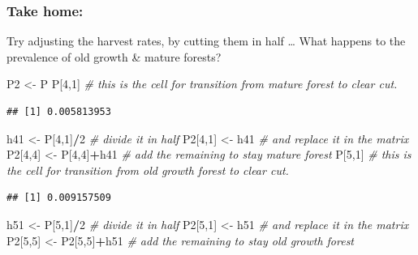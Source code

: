 \documentclass[
]{article}
\newenvironment{Shaded}{\begin{snugshade}}{\end{snugshade}}
\newcommand{\CommentTok}[1]{\textcolor[rgb]{0.56,0.35,0.01}{\textit{#1}}}
\newcommand{\DecValTok}[1]{\textcolor[rgb]{0.00,0.00,0.81}{#1}}
\newcommand{\NormalTok}[1]{#1}
\newcommand{\OtherTok}[1]{\textcolor[rgb]{0.56,0.35,0.01}{#1}}
\newcommand{\SpecialCharTok}[1]{\textcolor[rgb]{0.81,0.36,0.00}{\textbf{#1}}}
\begin{document}
\subsubsection{Take home:}\label{take-home}

Try adjusting the harvest rates, by cutting them in half \ldots{} What
happens to the prevalence of old growth \& mature forests?

\begin{Shaded}
\begin{Highlighting}[]
\NormalTok{P2 }\OtherTok{\textless{}{-}}\NormalTok{ P}
\NormalTok{P[}\DecValTok{4}\NormalTok{,}\DecValTok{1}\NormalTok{]   }\CommentTok{\# this is the cell for transition from mature forest to clear cut.}
\end{Highlighting}
\end{Shaded}

\begin{verbatim}
## [1] 0.005813953
\end{verbatim}

\begin{Shaded}
\begin{Highlighting}[]
\NormalTok{h41 }\OtherTok{\textless{}{-}}\NormalTok{ P[}\DecValTok{4}\NormalTok{,}\DecValTok{1}\NormalTok{]}\SpecialCharTok{/}\DecValTok{2}  \CommentTok{\# divide it in half}
\NormalTok{P2[}\DecValTok{4}\NormalTok{,}\DecValTok{1}\NormalTok{] }\OtherTok{\textless{}{-}}\NormalTok{ h41   }\CommentTok{\# and replace it in the matrix}
\NormalTok{P2[}\DecValTok{4}\NormalTok{,}\DecValTok{4}\NormalTok{] }\OtherTok{\textless{}{-}}\NormalTok{ P[}\DecValTok{4}\NormalTok{,}\DecValTok{4}\NormalTok{]}\SpecialCharTok{+}\NormalTok{h41  }\CommentTok{\# add the remaining to stay mature forest}
\NormalTok{P[}\DecValTok{5}\NormalTok{,}\DecValTok{1}\NormalTok{]    }\CommentTok{\# this is the cell for transition from old growth forest to clear cut.}
\end{Highlighting}
\end{Shaded}

\begin{verbatim}
## [1] 0.009157509
\end{verbatim}

\begin{Shaded}
\begin{Highlighting}[]
\NormalTok{h51 }\OtherTok{\textless{}{-}}\NormalTok{ P[}\DecValTok{5}\NormalTok{,}\DecValTok{1}\NormalTok{]}\SpecialCharTok{/}\DecValTok{2}   \CommentTok{\# divide it in half}
\NormalTok{P2[}\DecValTok{5}\NormalTok{,}\DecValTok{1}\NormalTok{] }\OtherTok{\textless{}{-}}\NormalTok{ h51   }\CommentTok{\# and replace it in the matrix}
\NormalTok{P2[}\DecValTok{5}\NormalTok{,}\DecValTok{5}\NormalTok{] }\OtherTok{\textless{}{-}}\NormalTok{ P2[}\DecValTok{5}\NormalTok{,}\DecValTok{5}\NormalTok{]}\SpecialCharTok{+}\NormalTok{h51  }\CommentTok{\# add the remaining to stay old growth forest}
\end{Highlighting}
\end{Shaded}
\end{document}
